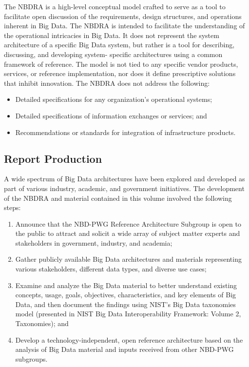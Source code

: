 \documentclass[11pt]{article}
\begin{document}
The NBDRA is a high-level conceptual model crafted to serve as a tool to facilitate open discussion of the 
requirements, design structures, and operations inherent in Big Data. The NBDRA is intended to facilitate 
the understanding of the operational intricacies in Big Data. It does not represent the system architecture 
of a specific Big Data system, but rather is a tool for describing, discussing, and developing system-
specific architectures using a common framework of reference. The model is not tied to any specific 
vendor products, services, or reference implementation, nor does it define prescriptive solutions that 
inhibit innovation. 
The NBDRA does not address the following:

\begin{itemize}
\item	Detailed specifications for any organization’s operational systems;
\item	Detailed specifications of information exchanges or services; and
\item	Recommendations or standards for integration of infrastructure products.
\end{itemize}


\subsection{Report Production }

A wide spectrum of Big Data architectures have been explored and developed as part of various industry, 
academic, and government initiatives. The development of the NBDRA and material contained in this 
volume involved the following steps:

\begin{enumerate}

\item Announce that the NBD-PWG Reference Architecture Subgroup is
  open to the public to attract and solicit a wide array of subject
  matter experts and stakeholders in government, industry, and
  academia;
\item Gather publicly available Big Data architectures and materials
  representing various stakeholders, different data types, and diverse
  use cases;
\item Examine and analyze the Big Data material to better understand
  existing concepts, usage, goals, objectives, characteristics, and
  key elements of Big Data, and then document the findings using
  NIST’s Big Data taxonomies model (presented in NIST Big Data
  Interoperability Framework: Volume 2, Taxonomies); and
\item Develop a technology-independent, open reference architecture
  based on the analysis of Big Data material and inputs received from
  other NBD-PWG subgroups.
\end{enumerate}
\end{document}

